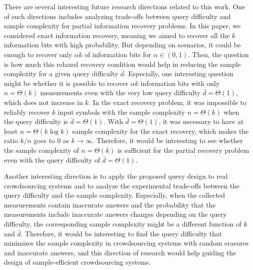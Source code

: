 \documentclass[11pt,onecolumn]{IEEEtran}
\newcommand{\bard}{\bar{d}}
\begin{document}
There are several interesting future research directions related to this work. 
One of such directions includes analyzing trade-offs between query difficulty and sample complexity for partial information recovery problems.
In this paper, we considered exact information recovery, meaning we aimed to recover all the $k$ information bits with high probability. 
But depending on scenarios, it could be enough to recover only $\alpha k$ of information bits for $\alpha\in(0,1)$.
Then, the question is how much this relaxed recovery condition would help in reducing the sample complexity for a given query difficulty $\bard$.
Especially, one interesting question might be whether it is possible to recover $\alpha k$ information bits with only $n=\Theta(k)$ measurements even with the very low query difficulty $\bard=\Theta(1)$, which does not increase in $k$. In the exact recovery problem, it was impossible to reliably recover $k$ input symbols with the sample complexity $n=\Theta(k)$ when the query difficulty is $\bard=\Theta(1)$. With $\bard=\Theta(1)$, it was necessary to have at least $n=\Theta(k\log k)$ sample complexity for the exact recovery, which makes the ratio $k/n$ goes to 0 as $k\to\infty$. Therefore, it would be interesting to see whether the sample complexity of $n=\Theta(k)$ is sufficient for the partial recovery problem even with the query difficulty of $\bard=\Theta(1)$.

Another interesting direction is to apply the proposed query design to real crowdsourcing systems and to analyze the experimental trade-offs between the query difficulty and the sample complexity.
Especially, when the collected measurements contain inaccurate answers and the probability that the measurements include inaccurate answers changes depending on the query difficulty, the corresponding sample complexity might be a different function of $k$ and $\bard$. Therefore, it would be interesting to find the query difficulty that minimizes the sample complexity in crowdsourcing systems with random erasures and inaccurate answers, and this direction of research would help guiding the design of sample-efficient crowdsourcing systems. 
\end{document}
